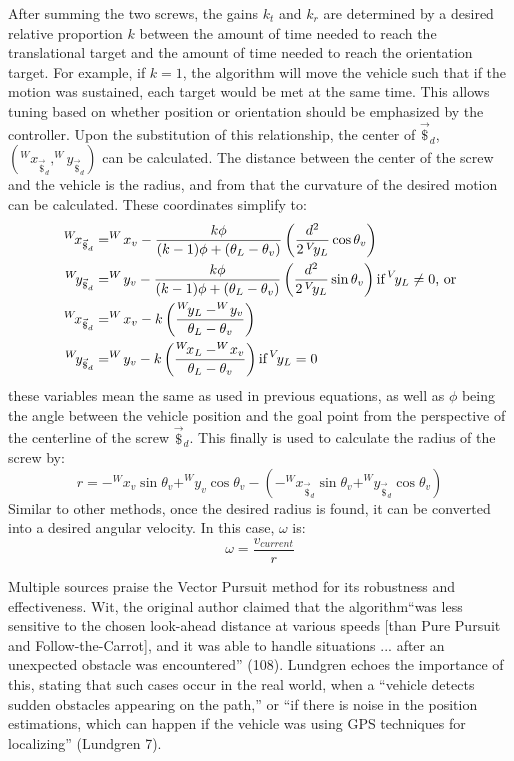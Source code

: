 \documentclass[mla7]{mla}
\begin{document}
\begin{paper}
After summing the two screws, the gains $k_t$ and $k_r$ are determined by a desired relative proportion $k$ between the amount of time needed to reach the translational target and the amount of time needed to reach the orientation target. For example, if $k=1$, the algorithm will move the vehicle such that if the motion was sustained, each target would be met at the same time. This allows tuning based on whether position or orientation should be emphasized by the controller. Upon the substitution of this relationship, the center of $\vec{\$}_d$, $(^W\!x_{\vec{\$}_d}, ^W\!y_{\vec{\$}_d})$ can be calculated. The distance between the center of the screw and the vehicle is the radius, and from that the curvature of the desired motion can be calculated. These coordinates simplify to:
\begin{subequations}
\begin{align}
^W\!x_{\vec{\$}_d} &=^W\!x_v - \frac{k\phi}{(k-1)\phi+(\theta_L-\theta_v)} \left( \frac{d^2}{2\,^V\!y_L}\cos{\theta_v} \right)\\
^W\!y_{\vec{\$}_d} &=^W\!y_v - \frac{k\phi}{(k-1)\phi+(\theta_L-\theta_v)} \left( \frac{d^2}{2\,^V\!y_L}\sin{\theta_v} \right)
\text{if\,}^V\!y_L\neq0 \text{, or}\\
^W\!x_{\vec{\$}_d} &= ^W\!x_v - k \left( \frac{^W\!y_L-^W\!y_v}{\theta_L-\theta_v} \right) \\
^W\!y_{\vec{\$}_d} &= ^W\!y_v - k \left( \frac{^W\!x_L-^W\!x_v}{\theta_L-\theta_v} \right) 
\text{if\,} ^V\!y_L=0
\end{align}
\end{subequations}
these variables mean the same as used in previous equations, as well as $\phi$ being the angle between the vehicle position and the goal point from the perspective of the centerline of the screw $\vec{\$}_d$.  This finally is used to calculate the radius of the screw by:
\begin{equation}
r= -^W\!x_v\sin{\theta_v}+^W\!y_v\cos{\theta_v}-\left(-^W\!x_{\vec{\$}_d}\sin{\theta_v}+^W\!y_{\vec{\$}_d}\cos{\theta_v}\right)
\end{equation}
Similar to other methods, once the desired radius is found, it can be converted into a desired angular velocity. In this case, $\omega$ is:
\begin{equation}
\omega=\frac{v_{current}}{r}
\end{equation}

Multiple sources praise the Vector Pursuit method for its robustness and effectiveness. Wit, the original author claimed that the algorithm``was less sensitive to the chosen look-ahead distance at various speeds [than Pure Pursuit and Follow-the-Carrot], and it was able to handle situations ... after an unexpected obstacle was encountered'' (108). Lundgren echoes the importance of this, stating that such cases occur in the real world, when a ``vehicle detects sudden obstacles appearing on the path,'' or ``if there is noise in the position estimations, which can happen if the vehicle was using GPS techniques for localizing'' (Lundgren 7).

\end{paper}
\end{document}
